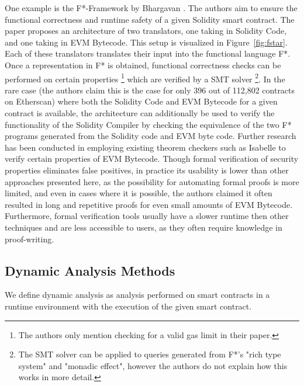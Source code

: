 \documentclass[letterpaper,twocolumn,10pt]{article}
\begin{document}
One example is the F*-Framework by Bhargavan \cite{bhargavan_delignat-lavaud_fournet_gollamudi_gonthier_kobeissi_kulatova_rastogi_sibut-pinote_swamy_etal._2016}. The authors aim to ensure the functional correctness and runtime safety of a given Solidity smart contract. The paper proposes an architecture of two translators, one taking in Solidity Code, and one taking in EVM Bytecode. This setup is visualized in Figure~\ref{fig:fstar}. Each of these translators translates their input into the functional language F*. Once a representation in F* is obtained, functional correctness checks can be performed on certain properties \footnote{The authors only mention checking for a valid gas limit in their paper.} which are verified by a SMT solver \footnote{The SMT solver can be applied to queries generated from F*'s "rich type system" and "monadic effect", however the authors do not explain how this works in more detail.}. In the rare case (the authors claim this is the case for only 396 out of 112,802 contracts on Etherscan) where both the Solidity Code and EVM Bytecode for a given contract is available, the architecture can additionally be used to verify the functionality of the Solidity Compiler by checking the equivalence of the two F* programs generated from the Solidity code and EVM byte code. 
Further research has been conducted in employing existing theorem checkers such as Isabelle\cite{amani_bégel_bortin_staples_2018} to verify certain properties of EVM Bytecode. Though formal verification of security properties eliminates false positives, in practice its usability is lower than other approaches presented here, as the possibility for automating formal proofs is more limited, and even in cases where it is possible, the authors claimed it often resulted in long and repetitive proofs for even small amounts of EVM Bytecode. Furthermore, formal verification tools usually have a slower runtime then other techniques and are less accessible to users, as they often require knowledge in proof-writing.


\subsection{Dynamic Analysis Methods}

We define dynamic analysis as analysis performed on smart contracts in a runtime environment with the execution of the given smart contract.
\end{document}
